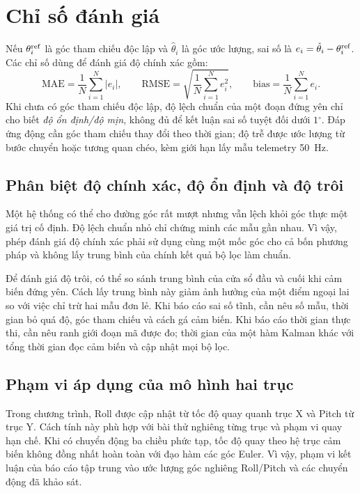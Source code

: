 \documentclass[14pt,a4paper,oneside]{extreport}
\newcommand{\degree}{\ensuremath{^{\circ}}}
\begin{document}
\section{Chỉ số đánh giá}
Nếu $\theta_i^{\rm ref}$ là góc tham chiếu độc lập và $\hat\theta_i$ là góc ước lượng, sai số là $e_i=\hat\theta_i-\theta_i^{\rm ref}$. Các chỉ số dùng để đánh giá độ chính xác gồm:
\begin{equation}\label{eq:metrics}
\mathrm{MAE}=\frac{1}{N}\sum_{i=1}^{N}|e_i|,\qquad
\mathrm{RMSE}=\sqrt{\frac{1}{N}\sum_{i=1}^{N}e_i^2},\qquad
\mathrm{bias}=\frac{1}{N}\sum_{i=1}^{N}e_i.
\end{equation}
Khi chưa có góc tham chiếu độc lập, độ lệch chuẩn của một đoạn đứng yên chỉ cho biết \emph{độ ổn định/độ mịn}, không đủ để kết luận sai số tuyệt đối dưới $1\degree$. Đáp ứng động cần góc tham chiếu thay đổi theo thời gian; độ trễ được ước lượng từ bước chuyển hoặc tương quan chéo, kèm giới hạn lấy mẫu telemetry 50~Hz.

\subsection{Phân biệt độ chính xác, độ ổn định và độ trôi}
Một hệ thống có thể cho đường góc rất mượt nhưng vẫn lệch khỏi góc thực một giá trị cố định. Độ lệch chuẩn nhỏ chỉ chứng minh các mẫu gần nhau. Vì vậy, phép đánh giá độ chính xác phải sử dụng cùng một mốc góc cho cả bốn phương pháp và không lấy trung bình của chính kết quả bộ lọc làm chuẩn.

Để đánh giá độ trôi, có thể so sánh trung bình của cửa sổ đầu và cuối khi cảm biến đứng yên. Cách lấy trung bình này giảm ảnh hưởng của một điểm ngoại lai so với việc chỉ trừ hai mẫu đơn lẻ. Khi báo cáo sai số tĩnh, cần nêu số mẫu, thời gian bỏ quá độ, góc tham chiếu và cách gá cảm biến. Khi báo cáo thời gian thực thi, cần nêu ranh giới đoạn mã được đo; thời gian của một hàm Kalman khác với tổng thời gian đọc cảm biến và cập nhật mọi bộ lọc.

\subsection{Phạm vi áp dụng của mô hình hai trục}
Trong chương trình, Roll được cập nhật từ tốc độ quay quanh trục X và Pitch từ trục Y. Cách tính này phù hợp với bài thử nghiêng từng trục và phạm vi quay hạn chế. Khi có chuyển động ba chiều phức tạp, tốc độ quay theo hệ trục cảm biến không đồng nhất hoàn toàn với đạo hàm các góc Euler. Vì vậy, phạm vi kết luận của báo cáo tập trung vào ước lượng góc nghiêng Roll/Pitch và các chuyển động đã khảo sát.
\end{document}
